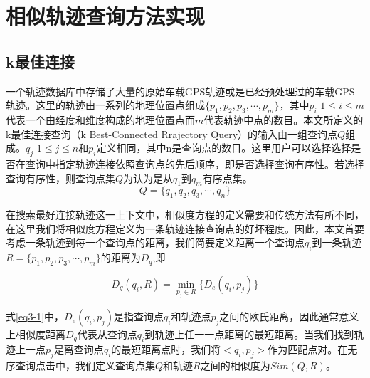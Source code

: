 

\theoremstyle{definition}
\newtheorem{definition}{定义}[section]

\chapter{相似轨迹查询方法实现}
\label{chap:implementation}

\section{k最佳连接}
\label{sec:k-bct}
一个轨迹数据库中存储了大量的原始车载GPS轨迹或是已经预处理过的车载GPS轨迹。这里的轨迹由一系列的地理位置点组成$\{p_{1},p_{2},p_{3},\cdots, p_{m}\}$，其中$p_{i}$ $1\leq i \leq m$代表一个由经度和维度构成的地理位置点而$m$代表轨迹中点的数目。本文所定义的k最佳连接查询（k Best-Connected Rrajectory Query）的输入由一组查询点$Q$组成。$q_{j}$ $1 \leq j \leq n$和$p_{i}$定义相同，其中n是查询点的数目。这里用户可以选择选择是否在查询中指定轨迹连接依照查询点的先后顺序，即是否选择查询有序性。若选择查询有序性，则查询点集$Q$为认为是从$q_{1}$到$q_{m}$有序点集。
\begin{displaymath}
	Q = \{q_{1},q_{2},q_{3},\cdots, q_{n}\}
\end{displaymath}

在搜索最好连接轨迹这一上下文中，相似度方程的定义需要和传统方法有所不同，在这里我们将相似度方程定义为一条轨迹连接查询点的好坏程度。因此，本文首要考虑一条轨迹到每一个查询点的距离，我们简要定义距离一个查询点$q_{i}$到一条轨迹$R=\{p_{1},p_{2},p_{3},\cdots, p_{m}\}$的距离为$D_{q}$,即

\begin{equation}
	\label{eq3-1}
	D_{q}(q_{i}, R) = \min_{p_{j} \in R} \{D_{e}(q_{i}, p_{j})\} 
\end{equation}

式\ref{eq3-1}中，$D_{e}(q_{i}, p_{j})$是指查询点$q_{i}$和轨迹点$p_{j}$之间的欧氏距离，因此通常意义上相似度距离$D_{q}$代表从查询点$q_{i}$到轨迹上任一一点距离的最短距离。当我们找到轨迹上一点$p_{j}$是离查询点$q_{i}$的最短距离点时，我们将$<q_{i},p_{j}>$作为匹配点对。在无序查询点击中，我们定义查询点集$Q$和轨迹$R$之间的相似度为$Sim(Q,R)$。

